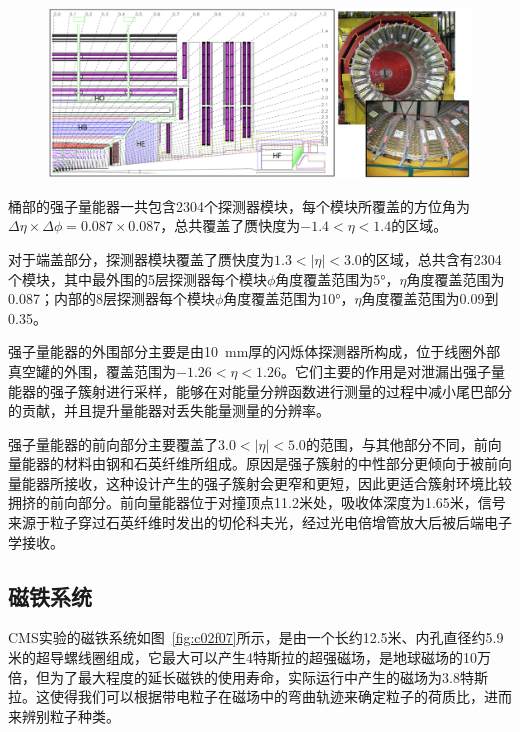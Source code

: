 \begin{figure}[!htbp]
    \centering
    \includegraphics[width=1.0\textwidth]{figures/chapter02/hcal.png}
    \label{fig:c02f06}
\end{figure}


桶部的强子量能器一共包含2304个探测器模块，每个模块所覆盖的方位角为$\Delta\eta\times\Delta\phi = 0.087\times0.087$，总共覆盖了赝快度为$-1.4<\eta<1.4$的区域。

对于端盖部分，探测器模块覆盖了赝快度为$1.3<|\eta|<3.0$的区域，总共含有2304个模块，其中最外围的5层探测器每个模块$\phi$角度覆盖范围为5\si{\degree}，$\eta$角度覆盖范围为0.087；内部的8层探测器每个模块$\phi$角度覆盖范围为10\si{\degree}，$\eta$角度覆盖范围为0.09到0.35。

强子量能器的外围部分主要是由10~\si{mm}厚的闪烁体探测器所构成，位于线圈外部真空罐的外围，覆盖范围为$-1.26<\eta<1.26$。它们主要的作用是对泄漏出强子量能器的强子簇射进行采样，能够在对能量分辨函数进行测量的过程中减小尾巴部分的贡献，并且提升量能器对丢失能量测量的分辨率。

强子量能器的前向部分主要覆盖了$3.0<|\eta|<5.0$的范围，与其他部分不同，前向量能器的材料由钢和石英纤维所组成。原因是强子簇射的中性部分更倾向于被前向量能器所接收，这种设计产生的强子簇射会更窄和更短，因此更适合簇射环境比较拥挤的前向部分。前向量能器位于对撞顶点11.2米处，吸收体深度为1.65米，信号来源于粒子穿过石英纤维时发出的切伦科夫光，经过光电倍增管放大后被后端电子学接收。

\subsection{磁铁系统}

CMS实验的磁铁系统如图~\ref{fig:c02f07}所示，是由一个长约12.5米、内孔直径约5.9米的超导螺线圈组成，它最大可以产生4特斯拉的超强磁场，是地球磁场的10万倍，但为了最大程度的延长磁铁的使用寿命，实际运行中产生的磁场为3.8特斯拉。这使得我们可以根据带电粒子在磁场中的弯曲轨迹来确定粒子的荷质比，进而来辨别粒子种类。

